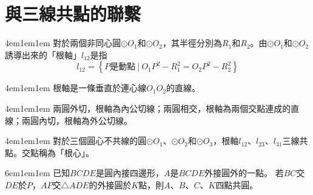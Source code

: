 \documentclass[12pt]{article}
\begin{document}
\section{與三線共點的聯繫}
\begin{mybox}[根軸]{4em}{1em}{1em}
    對於兩個非同心圓$\odot{O_1}$和$\odot{O_2}$，其半徑分別為$R_1$和$R_2$。由$\odot{O_1}$和$\odot{O_2}$誘導出來的「根軸」$l_{12}$是指
    $$
        l_{12}=\left\{P\text{是動點}\ |\ O_1P^2-R_1^2=O_2P^2-R_2^2\right\}
    $$
\end{mybox}
\begin{mybox}[定理1]{4em}{1em}{1em}
    根軸是一條垂直於連心線$O_1O_2$的直線。
\end{mybox}
\begin{mybox}[定理2]{4em}{1em}{1em}
    兩圓外切，根軸為內公切線；兩圓相交，根軸為兩個交點連成的直線；兩圓內切，根軸為外公切線。
\end{mybox}
\begin{mybox}[定理3]{4em}{1em}{1em}
    對於三個圓心不共線的圓$\odot{O_1}$、$\odot{O_2}$和$\odot{O_3}$，根軸$l_{12}$、$l_{23}$、$l_{31}$三線共點。交點稱為「根心」。
\end{mybox}
\begin{mybox}[例題\thesection-1]{6em}{1em}{1em}
    已知$BCDE$是圓內接四邊形，$A$是$BCDE$外接圓外的一點。
    若$BC$交$DE$於$P$，$AP$交$\triangle{ADE}$的外接圓於$K$點，則$A$、$B$、$C$、$K$四點共圓。
\end{mybox}
\end{document}

